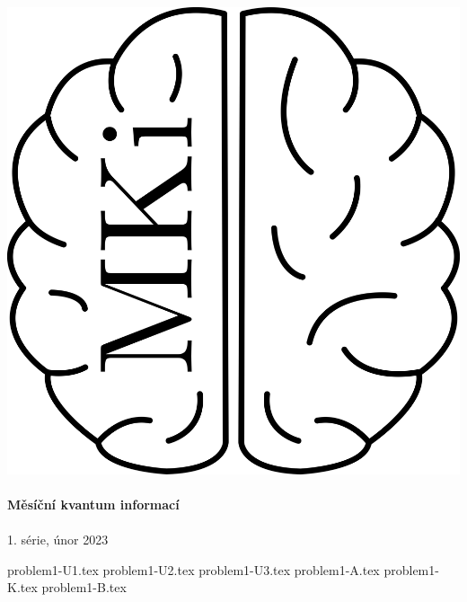 \documentclass[12pt]{article}
\begin{document}
\thispagestyle{firststyle}
\vspace*{\fill}
\begin{center}
\includegraphics[scale=1]{../../../../propagace/logo/mkilogo.png}\\
\quad\\
\textbf{\Huge{Měsíční kvantum informací}}\\
\quad\\
\LARGE{1. série, únor 2023}
\end{center}
\vspace*{\fill}

\newpage
{problem1-U1.tex}
\newpage
{problem1-U2.tex}
{problem1-U3.tex}
{problem1-A.tex}
{problem1-K.tex}
{problem1-B.tex}
\newpage
\end{document}
